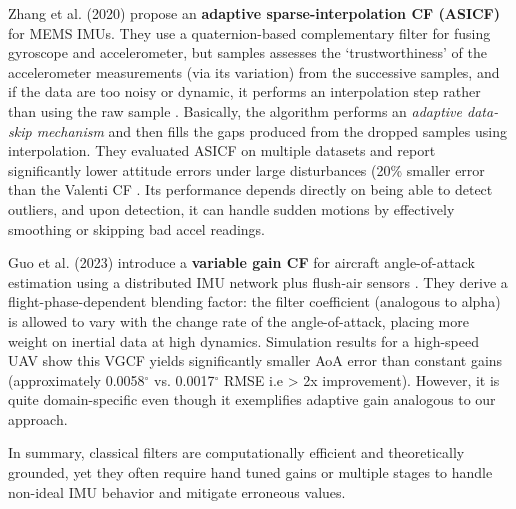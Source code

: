 \documentclass{iutbscthesis}
\begin{document}
Zhang et al. (2020) propose an \textbf{adaptive sparse-interpolation CF (ASICF)} for MEMS IMUs. They use a quaternion-based complementary filter for fusing gyroscope and accelerometer, but samples assesses the `trustworthiness' of the accelerometer measurements (via its variation) from the successive samples, and if the data are too noisy or dynamic, it performs an interpolation step rather than using the raw sample \cite{wang2020mems}. Basically, the algorithm performs an \textit{adaptive data-skip mechanism} and then fills the gaps produced from the dropped samples using interpolation. They evaluated ASICF on multiple datasets and report significantly lower attitude errors under large disturbances (20\% smaller error than the Valenti CF \cite{wang2020mems}. Its performance depends directly on being able to detect outliers, and upon detection, it can handle sudden motions by effectively smoothing or skipping bad accel readings.

Guo et al. (2023) introduce a \textbf{variable gain CF} for aircraft angle-of-attack estimation using a distributed IMU network plus flush-air sensors \cite{shao2023variablegainflushsesnsing}. They derive a flight-phase-dependent blending factor: the filter coefficient (analogous to alpha) is allowed to vary with the change rate of the angle-of-attack, placing more weight on inertial data at high dynamics. Simulation results for a high-speed UAV show this VGCF yields significantly smaller AoA error than constant gains (approximately 0.0058$^{\circ}$ vs. 0.0017$^{\circ}$ RMSE i.e > 2x improvement). However, it is quite domain-specific even though it exemplifies adaptive gain analogous to our approach. 

In summary, classical filters are computationally efficient and theoretically grounded, yet they often require hand tuned gains or multiple stages to handle non-ideal IMU behavior and mitigate erroneous values. 
\end{document}
